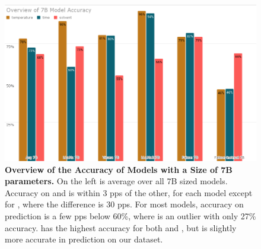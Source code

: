\begin{figure}[!htbp]
    \begin{centering}
        \includegraphics[width=\textwidth]{img/overview_7b_accuracy}
        \caption[Overview of 7B Models Accuracy]{\textbf{Overview of the Accuracy of Models with a Size of 7B parameters.}
        On the left is average over all 7B sized models.
        Accuracy on \ttemp and \ttime is within 3 \glspl{pp} of the other, for each model except for , where the difference is 30 \glspl{pp}.
        For most models, accuracy on \tsolv prediction is a few \glspl{pp} below 60\%, where  is an outlier with only 27\% accuracy.
         has the highest accuracy for both \ttemp and \ttime, but  is slightly more accurate in \tsolv prediction on our dataset.
        }
        \label{fig:7b_acc}
    \end{centering}
\end{figure}

